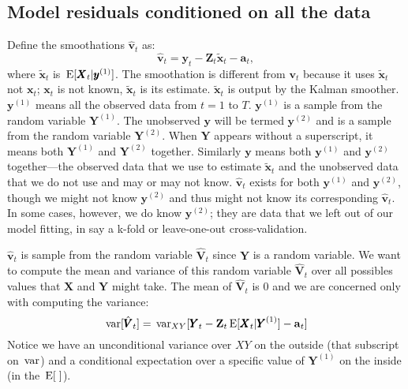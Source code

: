 \documentclass[]{article}
\def\UPS{\mbox{\boldmath $\Upsilon$}}
\def\XI{\mbox{\boldmath $\Xi$}}
\def\AA{\mbox{$\mathbf A$}}	\def\aa{\mbox{$\mathbf a$}}
\def\BB{\mbox{$\mathbf B$}}	\def\bb{\mbox{$\mathbf b$}} \def\Bb{\mbox{$\mathbf J$}} \def\Ba{\mbox{$\mathbf L$}} \def\Bm{\UPS}
\def\E{\,\textup{\textrm{E}}}
\def\VV{\mbox{$\pmb{V}$}}	\def\vv{\mbox{$\pmb{v}$}}
\def\XX{\mbox{$\pmb{X}$}}	\def\xx{\mbox{$\pmb{x}$}}
\def\YY{\mbox{$\pmb{Y}$}}	\def\yy{\mbox{$\pmb{y}$}}
\def\ZZ{\mbox{$\mathbf Z$}}	\def\zz{\mbox{$\mathbf z$}}	\def\Zb{\mbox{$\mathbf M$}} \def\Za{\mbox{$\mathbf N$}} \def\Zm{\XI}
\def\var{\,\textup{\textrm{var}}}
\def\hatxt{\widetilde{\xx}_t}
\begin{document}

\subsection{Model residuals conditioned on all the data}

Define the smoothations $\hat{\vv}_t$ as:
\begin{equation}\label{eq:vtT}
\hat{\vv}_t = \yy_t - \ZZ_t\hatxt - \aa_t,
\end{equation}
where  $\hatxt$ is $\E[\XX_t|\yy^{(1)}]$. The smoothation is different from $\vv_t$ because it uses $\hatxt$ not $\xx_t$; $\xx_t$ is not known, $\hatxt$ is its estimate. $\hatxt$ is output by the Kalman smoother. $\yy^{(1)}$ means all the observed data from $t=1$ to $T$. $\yy^{(1)}$ is a sample from the random variable $\YY^{(1)}$. The unobserved $\yy$ will be termed $\yy^{(2)}$ and is a sample from the random variable $\YY^{(2)}$. When $\YY$ appears without a superscript, it means both $\YY^{(1)}$ and $\YY^{(2)}$ together. Similarly $\yy$ means both $\yy^{(1)}$ and $\yy^{(2)}$ together---the observed data that we use to estimate $\hatxt$ and the unobserved data that we do not use and may or may not know. $\hat{\vv}_t$ exists for both $\yy^{(1)}$ and $\yy^{(2)}$, though we might not know $\yy^{(2)}$ and thus might not know its corresponding $\hat{\vv}_t$. In some cases, however, we do know $\yy^{(2)}$; they are data that we left out of our model fitting, in say a k-fold or leave-one-out cross-validation.

$\hat{\vv}_t$ is sample from the random variable $\hat{\VV}_t$ since $\YY$ is a random variable.  We want to compute the mean and variance of this random variable $\hat{\VV}_t$ over all possibles values that $\XX$ and $\YY$ might take. The mean of $\hat{\VV}_t$ is 0 and we are concerned only with computing the variance:
\begin{equation}\label{eq:var.vtT}
\var[\hat{\VV}_t] = \var_{XY}[\YY_t - \ZZ_t\E[\XX_t|\YY^{(1)}] - \aa_t]
\end{equation}
Notice we have an unconditional variance over $XY$ on the outside (that subscript on $\var$) and a conditional expectation over a specific value of $\YY^{(1)}$ on the inside (in the $\E[\;]$).
\end{document}
